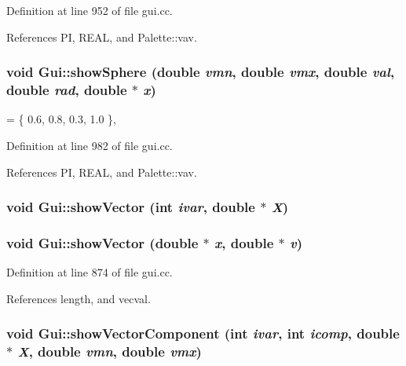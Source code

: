 Definition at line 952 of file gui.cc.

References PI, REAL, and Palette::vav.\hypertarget{namespaceGui_5c3ecb8dde5ba2aea7ef1d89ef30f66a}{
\subsubsection[{showSphere}]{\setlength{\rightskip}{0pt plus 5cm}void Gui::showSphere (double {\em vmn}, \/  double {\em vmx}, \/  double {\em val}, \/  double {\em rad}, \/  double $\ast$ {\em x})}}
\label{namespaceGui_5c3ecb8dde5ba2aea7ef1d89ef30f66a}




= \{ 0.6, 0.8, 0.3, 1.0 \}, 

Definition at line 982 of file gui.cc.

References PI, REAL, and Palette::vav.\hypertarget{namespaceGui_b2f8045a7d03276f092d05afd5be1e71}{
\subsubsection[{showVector}]{\setlength{\rightskip}{0pt plus 5cm}void Gui::showVector (int {\em ivar}, \/  double $\ast$ {\em X})}}
\label{namespaceGui_b2f8045a7d03276f092d05afd5be1e71}


\hypertarget{namespaceGui_f8cee9625f9a733c48a9dce46829368a}{
\subsubsection[{showVector}]{\setlength{\rightskip}{0pt plus 5cm}void Gui::showVector (double $\ast$ {\em x}, \/  double $\ast$ {\em v})}}
\label{namespaceGui_f8cee9625f9a733c48a9dce46829368a}




Definition at line 874 of file gui.cc.

References length, and vecval.\hypertarget{namespaceGui_fc1dab157022a5a7a7570d5e14c7111d}{
\subsubsection[{showVectorComponent}]{\setlength{\rightskip}{0pt plus 5cm}void Gui::showVectorComponent (int {\em ivar}, \/  int {\em icomp}, \/  double $\ast$ {\em X}, \/  double {\em vmn}, \/  double {\em vmx})}}
\label{namespaceGui_fc1dab157022a5a7a7570d5e14c7111d}


